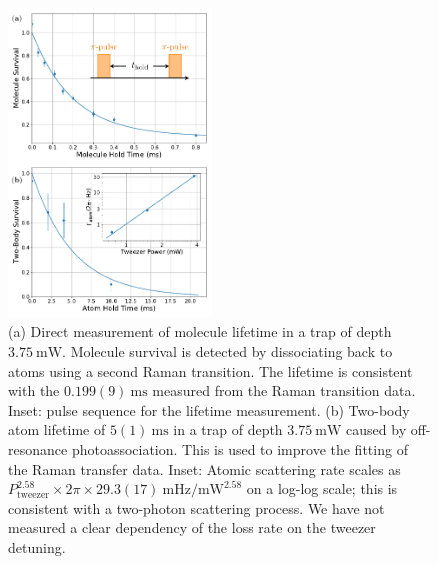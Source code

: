 \documentclass[aps,prl,twocolumn,10pt,superscriptaddress]{revtex4-1}
\begin{document}
\begin{figure}[t!]
  \includegraphics[width=0.48\textwidth]{imgs/fig-lifetime.pdf}
  \caption{
    (a) Direct measurement of molecule lifetime in a trap of depth $3.75~\mathrm{mW}$.
    Molecule survival is detected by dissociating back to atoms using a second Raman transition.
    The lifetime is consistent with the $0.199(9)~\mathrm{ms}$
    measured from the Raman transition data.
    Inset: pulse sequence for the lifetime measurement.
    (b) Two-body atom lifetime of $5(1)~\mathrm{ms}$
    in a trap of depth $3.75~\mathrm{mW}$ caused by off-resonance photoassociation.
    This is used to improve the fitting of the Raman transfer data.
    Inset: Atomic scattering rate scales as
    $P_\textrm{tweezer}^{2.58}\times\!2\pi\!\times29.3(17)~\mathrm{mHz/mW^{2.58}}$ on a log-log scale;
    this is consistent with a two-photon scattering process.
    We have not measured a clear dependency of the loss rate on the tweezer detuning.
    \label{f-lifetime}}
\end{figure}
\end{document}
